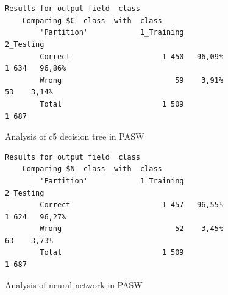\documentclass[11pt]{article}
\begin{document}
\mbox{}\\
\begin{table}[h]
\caption{Error matrix for c5 decision tree in PASW}
\label{tab:c5_pasw}
\end{table}


\mbox{}\\
\begin{table}[h]
\caption{Error matrix for neural network in PASW}
\label{tab:neural_pasw}
\end{table}


\begin{figure}[!ht]
	\centering
\begin{verbatim}
Results for output field  class 
	Comparing $C- class  with  class 
		'Partition'            1_Training            2_Testing         
		Correct                     1 450   96,09%       1 634   96,86%
		Wrong                          59    3,91%          53    3,14%
		Total                       1 509                1 687
\end{verbatim}
\caption{Analysis of c5 decision tree in PASW}
\end{figure}


\begin{figure}[!ht]
	\centering
\begin{verbatim}
Results for output field  class 
	Comparing $N- class  with  class 
		'Partition'            1_Training            2_Testing         
		Correct                     1 457   96,55%       1 624   96,27%
		Wrong                          52    3,45%          63    3,73%
		Total                       1 509                1 687         
\end{verbatim}
\caption{Analysis of neural network in PASW}
\end{figure}


\clearpage
\end{document}
